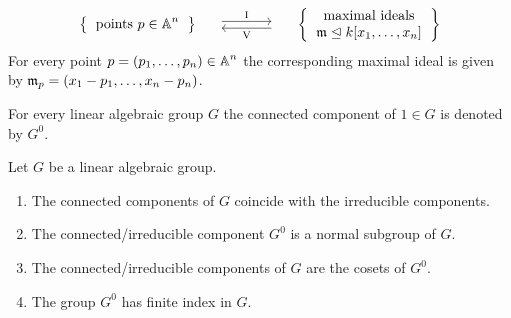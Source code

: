 \begin{theorem}
\[\begin{matrix}
      \\
        \left\{
          \begin{tabular}{c}
            points $p \in \Aff^n$
          \end{tabular}
        \right\}
      & \begin{tikzcd}[column sep = large]
            {}
            \arrow[shift left]{r}{\Ideal}
          & {}
            \arrow[shift left]{l}{\Vset}
        \end{tikzcd}
      & \left\{
          \begin{tabular}{c}
            maximal ideals \\
            $\mf{m} \idealleq k[x_1, \dotsc, x_n]$
          \end{tabular}
        \right\}
    \end{matrix}
  \]
  For every point $p = (p_1, \dotsc, p_n) \in \operatorname{\mathbb{A}}^n$ the corresponding maximal ideal is given by $\mathfrak{m}_p = (x_1 - p_1, \dotsc, x_n - p_n)$.
\end{theorem}


\begin{definition}
  For every linear algebraic group $G$ the connected component of $1 \in G$ is denoted by $G^0$.
\end{definition}


\begin{proposition}
  Let $G$ be a linear algebraic group.
  \begin{enumerate}
    \item
      The connected components of $G$ coincide with the irreducible components.
    \item
      The connected/irreducible component $G^0$ is a normal subgroup of $G$.
    \item
      The connected/irreducible components of $G$ are the cosets of $G^0$.
    \item
      The group $G^0$ has finite index in $G$.
  \end{enumerate}
\end{proposition}











